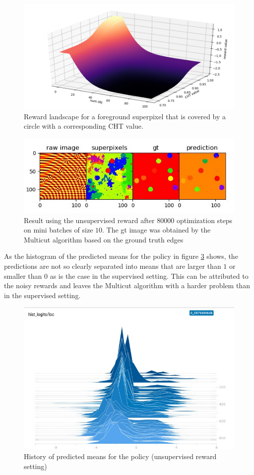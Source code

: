 \begin{figure}[ht!]
	\centering
	\includegraphics[width=.8\textwidth]{figures/plots/return_landscape.png}
	\caption{Reward landscape for a foreground superpixel that is covered by a circle with a corresponding CHT value.}
	\label{fig:ret_land}
\end{figure}
\begin{figure}[ht!]
	\centering
	\includegraphics[width=.8\textwidth]{figures/plots/res_unsup.jpeg}
	\caption{Result using the unsupervised reward after $80000$ optimization steps on mini batches of size $10$. The gt image was obtained by the Multicut algorithm based on the ground truth edges}
	\label{fig:resa_unsup}
\end{figure}
As the histogram of the predicted means for the policy in figure \ref{fig:resa_unsup_hist} shows, the predictions are not so clearly separated into means that are larger than $1$ or smaller than $0$ as is the case in the supervised setting. This can be attributed to the noisy rewards and leaves the Multicut algorithm with a harder problem than in the supervised setting.\\
\begin{figure}[ht!]
	\centering
	\includegraphics[width=.6\textwidth]{figures/plots/hist_unsup.jpeg}
	\caption{History of predicted means for the policy (unsupervised reward setting)}
	\label{fig:resa_unsup_hist}
\end{figure}

